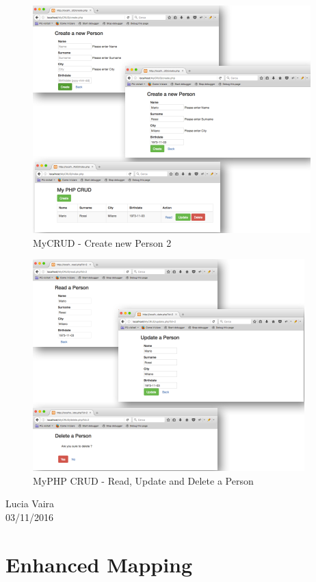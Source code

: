 \begin{center}
\begin{figure}[H]
\centering
\includegraphics[scale=1]{figures/nav2.png}
\caption{MyCRUD - Create new Person 2} 
\end{figure}
\end{center}

\begin{center}
\begin{figure}[H]
\centering
\includegraphics[scale=1]{figures/nav3.png}
\caption{MyPHP CRUD - Read, Update and Delete a Person} 
\end{figure}
\end{center}


\begin{flushright}Lucia Vaira\\03/11/2016\end{flushright}


\section{Enhanced Mapping}

